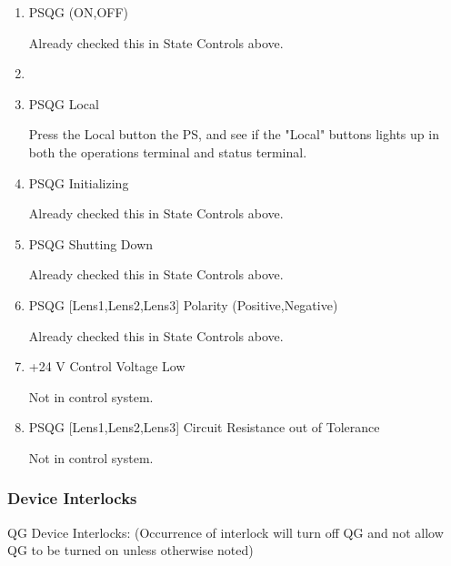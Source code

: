 \documentclass[11pt]{book}		%
\begin{document}
\begin{enumerate}

\item PSQG (ON,OFF)

\color{red}
Already checked this in State Controls above.
\color{black}

\item \item PSQG Local

\color{red}
Press the Local button the PS, and see if the "Local" buttons lights up in both the operations terminal and status terminal.
\color{black}

\item PSQG Initializing

\color{red}
Already checked this in State Controls above.
\color{black}

 \item PSQG Shutting Down

\color{red}
Already checked this in State Controls above.
\color{black}

 \item PSQG [Lens1,Lens2,Lens3] Polarity (Positive,Negative)

\color{red}
Already checked this in State Controls above.
\color{black}

\item +24 V Control Voltage Low

\color{red}
Not in control system.
\color{black}

\item PSQG [Lens1,Lens2,Lens3] Circuit Resistance out of Tolerance

\color{red}
Not in control system.
\color{black}

\end{enumerate}

\subsubsection{Device Interlocks}\label{sect:cyc-equip-ctl-beamline-quad1-state-monitors-device-interlocks}

QG Device Interlocks:
(Occurrence of interlock will turn off QG and not allow QG to be turned on unless otherwise noted)
\end{document}
